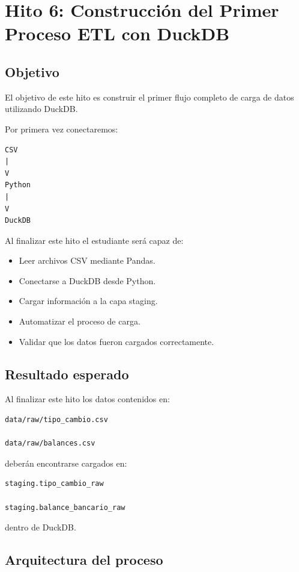 \chapter{Hito 6: Construcción del Primer Proceso ETL con DuckDB}

\section{Objetivo}

El objetivo de este hito es construir el primer flujo completo de carga de datos utilizando DuckDB.

Por primera vez conectaremos:

\begin{verbatim}
CSV
|
V
Python
|
V
DuckDB
\end{verbatim}

Al finalizar este hito el estudiante será capaz de:

\begin{itemize}
\item Leer archivos CSV mediante Pandas.
\item Conectarse a DuckDB desde Python.
\item Cargar información a la capa staging.
\item Automatizar el proceso de carga.
\item Validar que los datos fueron cargados correctamente.
\end{itemize}

\section{Resultado esperado}

Al finalizar este hito los datos contenidos en:

\begin{verbatim}
data/raw/tipo_cambio.csv

data/raw/balances.csv
\end{verbatim}

deberán encontrarse cargados en:

\begin{verbatim}
staging.tipo_cambio_raw

staging.balance_bancario_raw
\end{verbatim}

dentro de DuckDB.

\section{Arquitectura del proceso}

